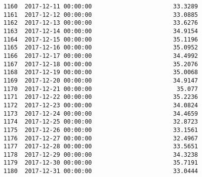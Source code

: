 \documentclass[11pt]{article}
\begin{document}
\begin{tcolorbox}[breakable, size=fbox, boxrule=.5pt, pad at break*=1mm, opacityfill=0]
\begin{Verbatim}[commandchars=\\\{\}]
1160  2017-12-11 00:00:00                       33.3289
1161  2017-12-12 00:00:00                       33.0885
1162  2017-12-13 00:00:00                       33.6276
1163  2017-12-14 00:00:00                       34.9154
1164  2017-12-15 00:00:00                       35.1196
1165  2017-12-16 00:00:00                       35.0952
1166  2017-12-17 00:00:00                       34.4992
1167  2017-12-18 00:00:00                       35.2076
1168  2017-12-19 00:00:00                       35.0068
1169  2017-12-20 00:00:00                       34.9147
1170  2017-12-21 00:00:00                        35.077
1171  2017-12-22 00:00:00                       35.2236
1172  2017-12-23 00:00:00                       34.0824
1173  2017-12-24 00:00:00                       34.4659
1174  2017-12-25 00:00:00                       32.8723
1175  2017-12-26 00:00:00                       33.1561
1176  2017-12-27 00:00:00                       32.4967
1177  2017-12-28 00:00:00                       33.5651
1178  2017-12-29 00:00:00                       34.3238
1179  2017-12-30 00:00:00                       35.7191
1180  2017-12-31 00:00:00                       33.0444


\end{Verbatim}
\end{tcolorbox}
\end{document}
